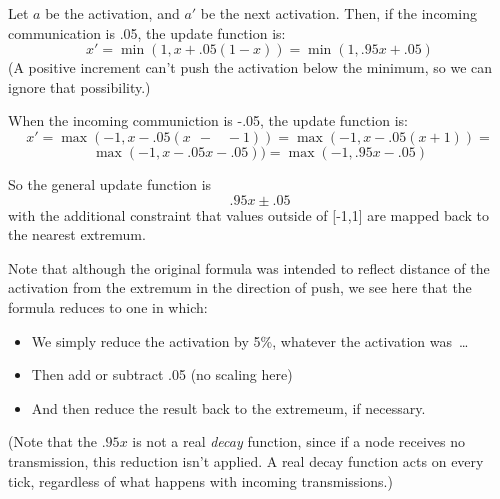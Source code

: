 \documentclass[12pt]{article}
\author{Marshall Abrams, University of Alabama at Birmingham, mabrams@uab.edu}
\begin{document}
\myfontscale %

Let $a$ be the activation, and $a'$ be the next activation.
Then, if the incoming communication is .05, the update function
is:
\[
x' = \min(1,x + .05(1 - x)) = \min(1,.95x + .05)
\]
(A positive increment can't push the activation below the
minimum, so we can ignore that possibility.)

When the incoming communiction is -.05, the update function is:
\[
x' = 
\max(-1,x - .05(x \;\,-\;\;\; -1)) = \max(-1,x - .05(x + 1)) = 
\]
%
\[
\max(-1,x - .05x - .05)) = \max(-1, .95x - .05)
\]
%

So the general update function is
\[
.95x \pm .05
\]
with the additional constraint that values outside of [-1,1] are
mapped back to the nearest extremum.

Note that although the original formula was intended to reflect
distance of the activation from the extremum in the direction of
push, we see here that the formula reduces to one in which:
\begin{itemize}\vspace{-2ex}
\item We simply reduce the activation by 5\%, whatever the
activation was\ \ldots
\item Then add or subtract .05 (no scaling here)
\item And then reduce the result back to the extremeum, if necessary.
\end{itemize}
%

(Note that the $.95x$ is not a real {\em decay\/} function, since if
a node receives no transmission, this reduction isn't applied.  A
real decay function acts on every tick, regardless of what happens
with incoming transmissions.)

%
\end{document}
